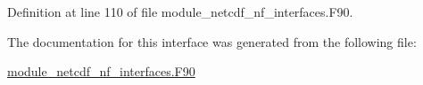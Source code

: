 Definition at line 110 of file module\+\_\+netcdf\+\_\+nf\+\_\+interfaces.\+F90.



The documentation for this interface was generated from the following file\+:\begin{DoxyCompactItemize}
\item 
\hyperlink{module__netcdf__nf__interfaces_8F90}{module\+\_\+netcdf\+\_\+nf\+\_\+interfaces.\+F90}\end{DoxyCompactItemize}
